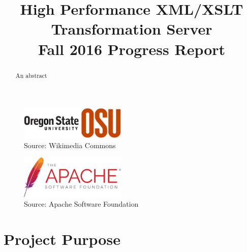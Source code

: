 

\title{
	High Performance XML/XSLT Transformation Server \\
    {
    	\LARGE Fall 2016 Progress Report 
    }
}
\author{
}



\maketitle
\begin{abstract}
  An abstract
\end{abstract}

\begin{figure}[h]
  \begin{centering}
    \includegraphics[width=0.45\textwidth]{figures/osu-logo}
    \caption{Source: Wikimedia Commons \cite{osu-logo}}
  \end{centering}
\end{figure}

\begin{figure}[h]
  \begin{centering}
    \includegraphics[width=0.45\textwidth]{figures/asf-logo}
    \caption{Source: Apache Software Foundation \cite{asf-logo}}
  \end{centering}
\end{figure}

\clearpage

\section{Project Purpose}

